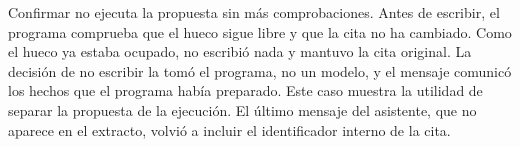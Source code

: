 Confirmar no ejecuta la propuesta sin más comprobaciones. Antes de escribir, el
programa comprueba que el hueco sigue libre y que la cita no ha cambiado. Como
el hueco ya estaba ocupado, no escribió nada y mantuvo la cita original. La
decisión de no escribir la tomó el programa, no un modelo, y el mensaje
comunicó los hechos que el programa había preparado. Este caso muestra la
utilidad de separar la propuesta de la ejecución. El último mensaje del
asistente, que no aparece en el extracto, volvió a incluir el identificador
interno de la cita.

